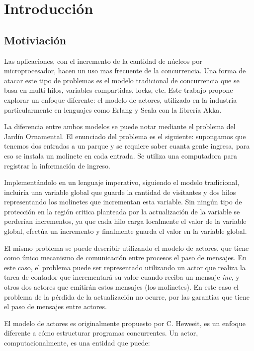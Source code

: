 \chapter{Introducción}

\section{Motiviación}

Las aplicaciones, con el incremento de la cantidad de núcleos por microprocesador, hacen un uso mas frecuente de la concurrencia. Una forma de atacar este tipo de problemas es el modelo tradicional de concurrencia que se basa en multi-hilos, variables compartidas, locks, etc. Este trabajo propone explorar un enfoque diferente: el modelo de actores, utilizado en la industria particularmente en lenguajes como Erlang\cite{Cesarini:2009:EP:1717841} y Scala\cite{scala-overview-tech-report} con la librería Akka\cite{Wyatt:2013:AC:2663429}. 

La diferencia entre ambos modelos se puede notar mediante el problema del Jardín Ornamental. El enunciado del problema es el siguiente: supongamos que tenemos dos entradas a un parque y se requiere saber cuanta gente ingresa, para eso se instala un molinete en cada entrada. Se utiliza una computadora para registrar la información de ingreso.

Implementándolo en un lenguaje imperativo, siguiendo el modelo tradicional, incluiría una variable global que guarde la cantidad de visitantes y dos hilos representando los molinetes que incrementan esta variable. Sin ningún tipo de protección en la región critica planteada por la actualización de la variable se perderían incrementos, ya que cada hilo carga localmente el valor de la variable global, efectúa un incremento y finalmente guarda el valor en la variable global. 

El mismo problema se puede describir utilizando el modelo de actores, que tiene como único mecanismo de comunicación entre procesos el paso de mensajes. En este caso, el problema puede ser representado utilizando un actor que realiza la tarea de contador que incrementará su valor cuando reciba un mensaje \emph{inc}, y otros dos actores que emitirán estos mensajes (los molinetes). En este caso el problema de la pérdida de la actualización no ocurre, por las garantías que tiene el paso de mensajes entre actores. 

El modelo de actores es originalmente propuesto por C. Heweeit\cite{Wyatt:2013:AC:2663429}, es un enfoque diferente a cómo estructurar programas concurrentes. Un actor, computacionalmente, es una entidad que puede:

